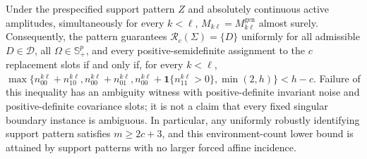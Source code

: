 Under the prespecified support pattern \(Z\) and absolutely continuous active amplitudes, simultaneously for every \(k<\ell\), \(M_{k\ell}=M_{k\ell}^{\mathrm{gen}}\) almost surely. Consequently, the pattern guarantees \(\mathcal R_c(\Sigma)=\{D\}\) uniformly for all admissible \(D\in\mathcal D\), all \(\Omega\in\mathbb S_{+}^{p}\), and every positive-semidefinite assignment to the \(c\) replacement slots if and only if, for every \(k<\ell\), \(\max\{n_{00}^{k\ell}+n_{10}^{k\ell},n_{00}^{k\ell}+n_{01}^{k\ell},n_{00}^{k\ell}+\mathbf 1\{n_{11}^{k\ell}>0\},\min(2,h)\}<h-c\). Failure of this inequality has an ambiguity witness with positive-definite invariant noise and positive-definite covariance slots; it is not a claim that every fixed singular boundary instance is ambiguous. In particular, any uniformly robustly identifying support pattern satisfies \(m\ge2c+3\), and this environment-count lower bound is attained by support patterns with no larger forced affine incidence.